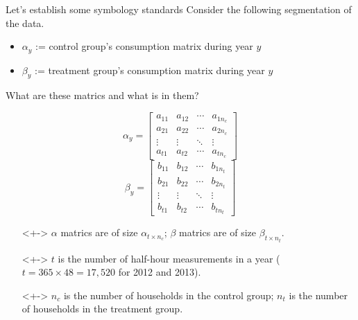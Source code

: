 \documentclass{beamer}
\begin{document}
\begin{frame}{Let's establish some symbology standards}
  Consider the following segmentation of the data.
  \begin{itemize}
    \item $\alpha_y$ := control group's consumption matrix during year $y$
    \item $\beta_y$ := treatment group's consumption matrix during year $y$
  \end{itemize}
\end{frame}

\begin{frame}{What are these matrics and what is in them?}
  \begin{multicols}{2}
  $$
  \alpha_y = \left[\begin{array}{cccc}
  a_{11} & a_{12} & \cdots & a_{1 n_c} \\
  a_{21} & a_{22} & \cdots & a_{2 n_c} \\
  \vdots & \vdots & \ddots & \vdots \\
  a_{t 1} & a_{t 2} & \cdots & a_{t n_c}
  \end{array}\right]
  $$
  \break
  $$
  \beta_y = \left[\begin{array}{cccc}
  b_{11} & b_{12} & \cdots & b_{1 n_t} \\
  b_{21} & b_{22} & \cdots & b_{2 n_t} \\
  \vdots & \vdots & \ddots & \vdots \\
  b_{t 1} & b_{t 2} & \cdots & b_{t n_t}
  \end{array}\right]
  $$
  \end{multicols}
  \begin{itemize}
  \item[]<+-> $\alpha$ matrics are of size $\alpha_{t \times n_c}$; $\beta$ matrics are of size $\beta_{t \times n_t}$.
  \item[]<+-> $t$ is the number of half-hour measurements in a year ($t = 365 \times 48 = 17,520$ for 2012 and 2013).
  \item[]<+-> $n_c$ is the number of households in the control group; $n_t$ is the number of households in the treatment group. 
  \end{itemize}
\end{frame}
\end{document}
